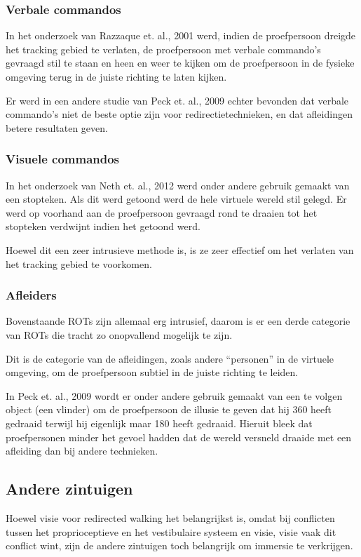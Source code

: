 \documentclass[a4paper,12pt]{article}
\begin{document}
\subsubsection{Verbale commandos}
In het onderzoek van Razzaque et. al., 2001 \cite{kohn01} werd, indien de
proefpersoon dreigde het tracking gebied te verlaten, de proefpersoon met verbale
commando's gevraagd stil te staan en heen en weer te kijken om de proefpersoon in
de fysieke omgeving terug in de juiste richting te laten kijken.

Er werd in een andere studie van Peck et. al., 2009 \cite{peck09} echter bevonden 
dat verbale commando's niet de beste optie zijn voor redirectietechnieken, en dat
afleidingen betere resultaten geven.


\subsubsection{Visuele commandos}
In het onderzoek van Neth et. al., 2012 \cite{neth12} werd onder andere gebruik 
gemaakt van een stopteken. Als dit werd getoond werd de hele virtuele wereld stil 
gelegd. Er werd op voorhand aan de proefpersoon gevraagd rond te draaien tot het 
stopteken verdwijnt indien het getoond werd.

Hoewel dit een zeer intrusieve methode is, is ze zeer effectief om het verlaten
van het tracking gebied te voorkomen.


\subsubsection{Afleiders}
Bovenstaande ROTs zijn allemaal erg intrusief, daarom is er een derde categorie
van ROTs die tracht zo onopvallend mogelijk te zijn.

Dit is de categorie van de afleidingen, zoals andere ``personen'' in de virtuele
omgeving\cite{neth12}, om de proefpersoon subtiel in de juiste richting te 
leiden.

In Peck et. al., 2009 \cite{peck09} wordt er onder andere gebruik gemaakt van een 
te volgen object (een vlinder) om de proefpersoon de illusie te geven dat hij 
\mbox{360\textdegree} heeft gedraaid terwijl hij eigenlijk maar 180\textdegree{}
heeft gedraaid. Hieruit bleek dat proefpersonen minder het gevoel hadden dat de
wereld versneld draaide met een afleiding dan bij andere technieken.


\subsection{Andere zintuigen}
Hoewel visie voor redirected walking het belangrijkst is, omdat bij conflicten
tussen het proprioceptieve en het vestibulaire systeem en visie, visie vaak dit
conflict wint\cite{berthoz02,dichgans78,bruder08}, zijn de andere zintuigen toch
belangrijk om immersie te verkrijgen. 
\end{document}
